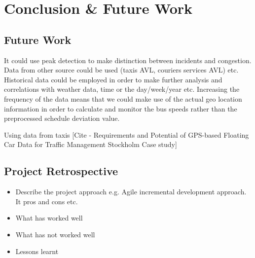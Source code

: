 \chapter{Conclusion \& Future Work}

\section{Future Work}
It could use peak detection to make distinction between incidents and congestion.
Data from other source could be used (taxis AVL, couriers services AVL) etc.
Historical data could be employed in order to make further analysis and correlations with weather data, time or the day/week/year etc.
Increasing the frequency of the data means that we could make use of the actual geo location information in order to calculate and monitor the bus speeds rather than the preprocessed schedule deviation value.

Using data from taxis [Cite - Requirements and Potential of GPS-based Floating Car Data for Traffic Management Stockholm Case study]


\section{Project Retrospective}
\begin{itemize}
	\item Describe the project approach e.g. Agile incremental development approach. It pros and cons etc. 
	\item What has worked well
	\item What has not worked well
	\item Lessons learnt
\end{itemize}

